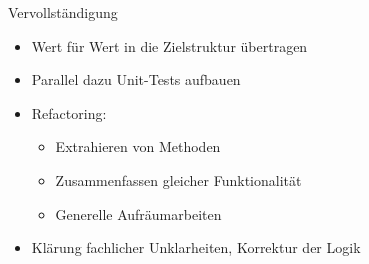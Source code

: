 \begin{frame}[t,fragile]{Vervollständigung}
\begin{itemize}
\item Wert für Wert in die Zielstruktur übertragen
\item Parallel dazu Unit-Tests aufbauen
\item Refactoring: 
\begin{itemize}
\item Extrahieren von Methoden
\item Zusammenfassen gleicher Funktionalität
\item Generelle Aufräumarbeiten
\end{itemize}
\item Klärung fachlicher Unklarheiten, Korrektur der Logik
\end{itemize}
\end{frame}

%
%
%
%

